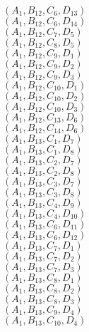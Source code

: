 \documentclass[14pt]{article}
\begin{document}
    $({A}_{1}, {B}_{12}, {C}_{6}, {D}_{13}) $ \\ 
    $({A}_{1}, {B}_{12}, {C}_{6}, {D}_{14}) $ \\ 
    $({A}_{1}, {B}_{12}, {C}_{7}, {D}_{5}) $ \\ 
    $({A}_{1}, {B}_{12}, {C}_{8}, {D}_{5}) $ \\ 
    $({A}_{1}, {B}_{12}, {C}_{9}, {D}_{1}) $ \\ 
    $({A}_{1}, {B}_{12}, {C}_{9}, {D}_{2}) $ \\ 
    $({A}_{1}, {B}_{12}, {C}_{9}, {D}_{3}) $ \\ 
    $({A}_{1}, {B}_{12}, {C}_{10}, {D}_{1}) $ \\ 
    $({A}_{1}, {B}_{12}, {C}_{10}, {D}_{2}) $ \\ 
    $({A}_{1}, {B}_{12}, {C}_{10}, {D}_{3}) $ \\ 
    $({A}_{1}, {B}_{12}, {C}_{13}, {D}_{6}) $ \\ 
    $({A}_{1}, {B}_{12}, {C}_{14}, {D}_{6}) $ \\ 
    $({A}_{1}, {B}_{13}, {C}_{1}, {D}_{7}) $ \\ 
    $({A}_{1}, {B}_{13}, {C}_{1}, {D}_{8}) $ \\ 
    $({A}_{1}, {B}_{13}, {C}_{2}, {D}_{7}) $ \\ 
    $({A}_{1}, {B}_{13}, {C}_{2}, {D}_{8}) $ \\ 
    $({A}_{1}, {B}_{13}, {C}_{3}, {D}_{7}) $ \\ 
    $({A}_{1}, {B}_{13}, {C}_{3}, {D}_{8}) $ \\ 
    $({A}_{1}, {B}_{13}, {C}_{4}, {D}_{9}) $ \\ 
    $({A}_{1}, {B}_{13}, {C}_{4}, {D}_{10}) $ \\ 
    $({A}_{1}, {B}_{13}, {C}_{6}, {D}_{11}) $ \\ 
    $({A}_{1}, {B}_{13}, {C}_{6}, {D}_{12}) $ \\ 
    $({A}_{1}, {B}_{13}, {C}_{7}, {D}_{1}) $ \\ 
    $({A}_{1}, {B}_{13}, {C}_{7}, {D}_{2}) $ \\ 
    $({A}_{1}, {B}_{13}, {C}_{7}, {D}_{3}) $ \\ 
    $({A}_{1}, {B}_{13}, {C}_{8}, {D}_{1}) $ \\ 
    $({A}_{1}, {B}_{13}, {C}_{8}, {D}_{2}) $ \\ 
    $({A}_{1}, {B}_{13}, {C}_{8}, {D}_{3}) $ \\ 
    $({A}_{1}, {B}_{13}, {C}_{9}, {D}_{4}) $ \\ 
    $({A}_{1}, {B}_{13}, {C}_{10}, {D}_{4}) $ \\ 
\end{document}
